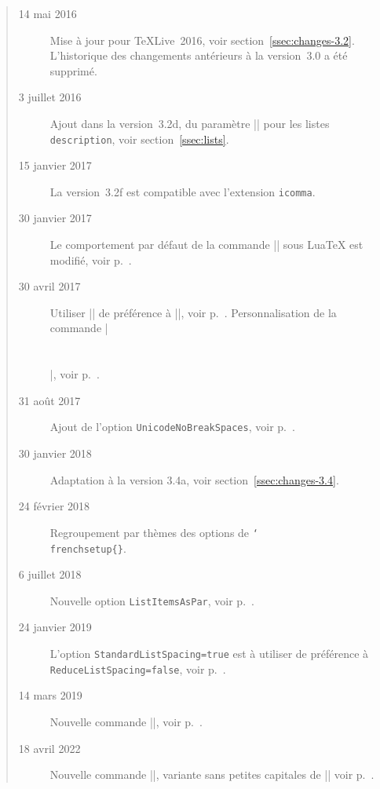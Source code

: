\documentclass[a4paper,12pt,german,english,french]{article}
\def\ColorVerb{\color{MidnightBlue}}
\def\ColorArg{\color{Sepia}}
\newcommand*{\ext}[1]{\texttt{\ColorVerb #1}}
\newcommand*{\env}[1]{\texttt{\ColorVerb #1}}
\DeclareRobustCommand\cs[1]{\texttt{\ColorVerb \char`\\#1}}%
\newcommand*\fbo[1]{\texttt{\ColorArg #1}}
\newcommand*\fbsetup[1]{\cs{frenchsetup\{\fbo{#1}\}}}
\renewcommand*\descriptionlabel[1]{\hspace\labelsep
      \normalfont\ttfamily\bfseries {\MyColor #1}}
\let\MyColor\relax
\begin{document}
\bgroup
\renewcommand{\abstractname}%
             {Historique des mises à jour de cette documentation}
\newlength\mybox
\settowidth{\mybox}{5 décembre 2012}
\renewcommand{\descriptionlabel}[1]{\makebox[\mybox][l]{\textbf{#1 :}}}
\vspace{\baselineskip}\noindent
\begin{abstract}
  \vspace{-\baselineskip}\noindent
  \descindentFB=0pt
  \begin{description}
  \item[14 mai 2016] Mise à jour pour TeXLive~2016,
    voir section~\ref{ssec:changes-3.2}. L’historique des changements
    antérieurs à la version~3.0 a été supprimé.
  \item[3 juillet 2016] Ajout dans la version~3.2d, du paramètre
    |\descindentFB| pour les listes \env{description}, voir
    section~\ref{ssec:lists}.
  \item[15 janvier 2017] La version~3.2f est compatible avec l’extension
    \ext{icomma}.
  \item[30 janvier 2017] Le comportement par défaut de la commande
    |\frquote{}| sous LuaTeX est modifié, voir p.~\pageref{frquote}.
  \item[30 avril 2017] Utiliser |\frenchsetup{}| de préférence à
    |\frenchbsetup{}|, voir p.~\pageref{sec:Perso}.
    Personnalisation de la commande |\part{}|, voir p.~\pageref{ssec:captions}.
  \item[31 août 2017] Ajout de l’option \fbo{UnicodeNoBreakSpaces},
    voir p.~\pageref{ucs-nbsp}.
  \item[30 janvier 2018] Adaptation à la version 3.4a, voir
    section~\ref{ssec:changes-3.4}.
  \item[24 février 2018] Regroupement par thèmes des options de \fbsetup{}.
  \item[6 juillet 2018] Nouvelle option \fbo{ListItemsAsPar},
    voir p.~\pageref{ListAsPar}.
  \item[24 janvier 2019] L’option \fbo{StandardListSpacing=true} est à utiliser
    de préférence à \fbo{ReduceListSpacing=false},
    voir p.~\pageref{listspacing}.
  \item[14 mars 2019] Nouvelle commande |\NoEveryParQuote|,  voir
    p.~\pageref{frquote}.
  \item[18 avril 2022] Nouvelle commande |\bname{}|, variante sans petites
    capitales de |\bsc{}|  voir p.~\pageref{bname}.
\end{description}
\end{abstract}
\egroup
\end{document}
